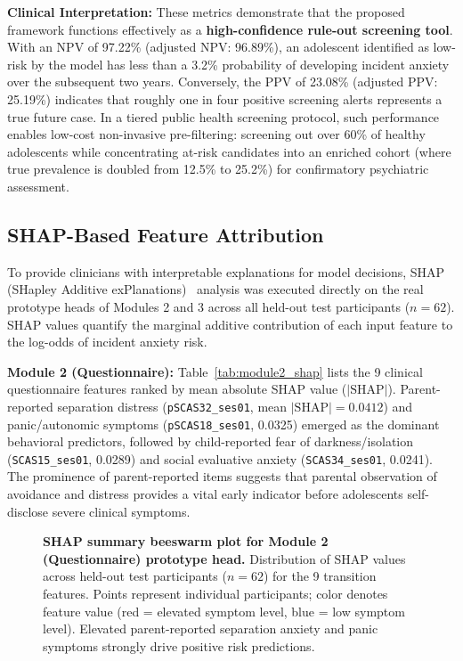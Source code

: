 \documentclass[10pt,letterpaper]{article}
\begin{document}
\textbf{Clinical Interpretation:} These metrics demonstrate that the proposed framework functions effectively as a \textbf{high-confidence rule-out screening tool}. With an NPV of 97.22\% (adjusted NPV: 96.89\%), an adolescent identified as low-risk by the model has less than a 3.2\% probability of developing incident anxiety over the subsequent two years. Conversely, the PPV of 23.08\% (adjusted PPV: 25.19\%) indicates that roughly one in four positive screening alerts represents a true future case. In a tiered public health screening protocol, such performance enables low-cost non-invasive pre-filtering: screening out over 60\% of healthy adolescents while concentrating at-risk candidates into an enriched cohort (where true prevalence is doubled from 12.5\% to 25.2\%) for confirmatory psychiatric assessment.

\subsection*{SHAP-Based Feature Attribution}

To provide clinicians with interpretable explanations for model decisions, SHAP (SHapley Additive exPlanations)~\cite{ref_shap} analysis was executed directly on the real prototype heads of Modules 2 and 3 across all held-out test participants ($n=62$). SHAP values quantify the marginal additive contribution of each input feature to the log-odds of incident anxiety risk.

\textbf{Module 2 (Questionnaire):} Table~\ref{tab:module2_shap} lists the 9 clinical questionnaire features ranked by mean absolute SHAP value ($|\mathrm{SHAP}|$). Parent-reported separation distress (\texttt{pSCAS32\_ses01}, mean $|\mathrm{SHAP}| = 0.0412$) and panic/autonomic symptoms (\texttt{pSCAS18\_ses01}, 0.0325) emerged as the dominant behavioral predictors, followed by child-reported fear of darkness/isolation (\texttt{SCAS15\_ses01}, 0.0289) and social evaluative anxiety (\texttt{SCAS34\_ses01}, 0.0241). The prominence of parent-reported items suggests that parental observation of avoidance and distress provides a vital early indicator before adolescents self-disclose severe clinical symptoms.

\begin{figure}[!h]
\caption{\textbf{SHAP summary beeswarm plot for Module 2 (Questionnaire) prototype head.}
Distribution of SHAP values across held-out test participants ($n=62$) for the 9 transition features. Points represent individual participants; color denotes feature value (red = elevated symptom level, blue = low symptom level). Elevated parent-reported separation anxiety and panic symptoms strongly drive positive risk predictions.}
\label{fig:module2_shap_summary}
\end{figure}
\end{document}
